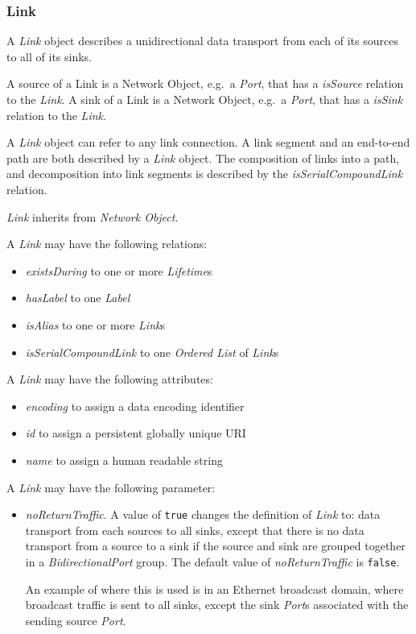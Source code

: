 \subsubsection{Link}%
\label{class:link}

A \emph{Link} object describes a unidirectional data transport from each of its sources to all of its sinks.

A source of a Link is a Network Object, e.g.\ a \emph{Port}, that has a \emph{isSource} relation to the \emph{Link}.
A sink of a Link is a Network Object, e.g.\ a \emph{Port}, that has a \emph{isSink} relation to the \emph{Link}.

A \emph{Link} object can refer to any link connection. A link segment and an end-to-end path are both described by a \emph{Link} object. The composition of links into a path, and decomposition into link segments is described by the \emph{isSerialCompoundLink} relation.

\emph{Link} inherits from \emph{Network Object}.

A \emph{Link} may have the following relations:
\begin{itemize}
    \item \emph{existsDuring} to one or more \emph{Lifetime}s
    \item \emph{hasLabel} to one \emph{Label}
    \item \emph{isAlias} to one or more \emph{Link}s
    \item \emph{isSerialCompoundLink} to one \emph{Ordered List} of \emph{Link}s
\end{itemize}

A \emph{Link} may have the following attributes:
\begin{itemize}
    \item \emph{encoding} to assign a data encoding identifier
    \item \emph{id} to assign a persistent globally unique URI
    \item \emph{name} to assign a human readable string
\end{itemize}

A \emph{Link} may have the following parameter:
\begin{itemize}
    \item \emph{noReturnTraffic}. A value of \texttt{true} changes the definition of \emph{Link} to: data transport from each sources to all sinks, except that there is no data transport from a source to a sink if the source and sink are grouped together in a \emph{BidirectionalPort} group. The default value of \emph{noReturnTraffic} is \texttt{false}.
    
    An example of where this is used is in an Ethernet broadcast domain, where broadcast traffic is sent to all sinks, except the sink \emph{Port}s associated with the sending source \emph{Port}.
\end{itemize}

